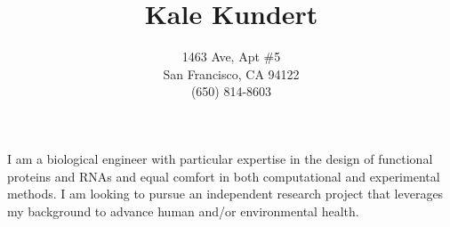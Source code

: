 \documentclass{article}
\title{Kale Kundert}
\author{1463 \nth{10} Ave, Apt \#5\\San Francisco, CA 94122\\(650) 814-8603}
\date{}
\begin{document}
 \maketitle

 \pagestyle{empty}
 \thispagestyle{empty}

 I am a biological engineer with particular expertise in the design of 
 functional proteins and RNAs and equal comfort in both computational and 
 experimental methods.  I am looking to pursue an independent research project 
 that leverages my background to advance human and/or environmental health.
 
 
 
 
 
 
 
 
 
 
 
 
\end{document}
